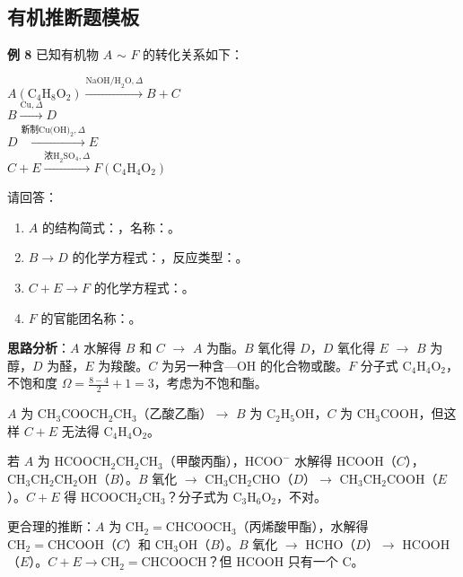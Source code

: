 \subsection{有机推断题模板}

\textbf{例 8} 已知有机物 $A$ $\sim$ $F$ 的转化关系如下：

$A(\text{C}_4\text{H}_8\text{O}_2) \xrightarrow{\text{NaOH/H}_2\text{O},\Delta} B + C$\\
$B \xrightarrow{\text{Cu},\Delta} D$\\
$D \xrightarrow{\text{新制Cu(OH)}_2,\Delta} E$\\
$C + E \xrightarrow{\text{浓H}_2\text{SO}_4,\Delta} F(\text{C}_4\text{H}_4\text{O}_2)$

请回答：
\begin{enumerate}
  \item $A$ 的结构简式：\underline{\qquad\qquad}，名称：\underline{\qquad\qquad}。
  \item $B \to D$ 的化学方程式：\underline{\qquad\qquad}，反应类型：\underline{\qquad\qquad}。
  \item $C + E \to F$ 的化学方程式：\underline{\qquad\qquad}。
  \item $F$ 的官能团名称：\underline{\qquad\qquad}。
\end{enumerate}

\textbf{思路分析}：$A$ 水解得 $B$ 和 $C$ $\to$ $A$ 为酯。$B$ 氧化得 $D$，$D$ 氧化得 $E$ $\to$ $B$ 为醇，$D$ 为醛，$E$ 为羧酸。$C$ 为另一种含$\text{—OH}$ 的化合物或酸。$F$ 分子式 $\text{C}_4\text{H}_4\text{O}_2$，不饱和度 $\Omega = \frac{8-4}{2}+1=3$，考虑为不饱和酯。

$A$ 为 $\text{CH}_3\text{COOCH}_2\text{CH}_3$（乙酸乙酯）$\to$ $B$ 为 $\text{C}_2\text{H}_5\text{OH}$，$C$ 为 $\text{CH}_3\text{COOH}$，但这样 $C+E$ 无法得 $\text{C}_4\text{H}_4\text{O}_2$。

若 $A$ 为 $\text{HCOOCH}_2\text{CH}_2\text{CH}_3$（甲酸丙酯），$\text{HCOO}^-$ 水解得 $\text{HCOOH}$（$C$），$\text{CH}_3\text{CH}_2\text{CH}_2\text{OH}$（$B$）。$B$ 氧化 $\to$ $\text{CH}_3\text{CH}_2\text{CHO}$（$D$）$\to$ $\text{CH}_3\text{CH}_2\text{COOH}$（$E$）。$C + E$ 得 $\text{HCOOCH}_2\text{CH}_3$？分子式为 $\text{C}_3\text{H}_6\text{O}_2$，不对。

更合理的推断：$A$ 为 $\text{CH}_2=\text{CHCOOCH}_3$（丙烯酸甲酯），水解得 $\text{CH}_2=\text{CHCOOH}$（$C$）和 $\text{CH}_3\text{OH}$（$B$）。$B$ 氧化 $\to$ $\text{HCHO}$（$D$）$\to$ $\text{HCOOH}$（$E$）。$C + E \to \text{CH}_2=\text{CHCOOCH}$？但 HCOOH 只有一个 C。

